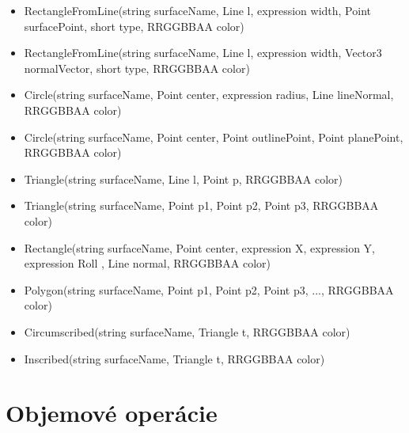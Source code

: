 \begin{itemize}

	\item RectangleFromLine(string surfaceName, Line l, expression width, Point surfacePoint, short type, RRGGBBAA color)
	
	\item RectangleFromLine(string surfaceName, Line l, expression width, Vector3 normalVector, short type, RRGGBBAA color)

	\item Circle(string surfaceName, Point center, expression radius, Line lineNormal, RRGGBBAA color)
	
	\item Circle(string surfaceName, Point center, Point outlinePoint, Point planePoint, RRGGBBAA color)

	\item Triangle(string surfaceName, Line l, Point p, RRGGBBAA color)
	
	\item Triangle(string surfaceName, Point p1, Point p2, Point p3, RRGGBBAA color)


	\item Rectangle(string surfaceName, Point center, expression X, expression Y, expression Roll
    , Line normal, RRGGBBAA color)

	\item Polygon(string surfaceName, Point p1, Point p2, Point p3, ..., RRGGBBAA color)


	\item Circumscribed(string surfaceName, Triangle t, RRGGBBAA color) 
	
	\item Inscribed(string surfaceName, Triangle t, RRGGBBAA color)		
	
\end{itemize}
\section{Objemové operácie}

